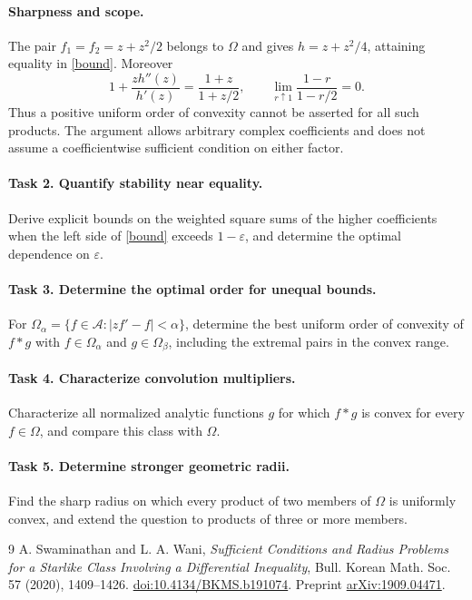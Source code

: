 \documentclass[11pt]{article}
\begin{document}
\paragraph{Sharpness and scope.}
The pair $f_1=f_2=z+z^2/2$ belongs to $\Omega$ and gives
$h=z+z^2/4$, attaining equality in \eqref{bound}. Moreover
\[
 1+\frac{zh''(z)}{h'(z)}=\frac{1+z}{1+z/2},
 \qquad \lim_{r\uparrow1}\frac{1-r}{1-r/2}=0.
\]
Thus a positive uniform order of convexity cannot be asserted for all such
products. The argument allows arbitrary complex coefficients and does not
assume a coefficientwise sufficient condition on either factor.

\paragraph{Task 2. Quantify stability near equality.}
Derive explicit bounds on the weighted square sums of the higher
coefficients when the left side of \eqref{bound} exceeds $1-\varepsilon$,
and determine the optimal dependence on $\varepsilon$.

\paragraph{Task 3. Determine the optimal order for unequal bounds.}
For $\Omega_\alpha=\{f\in\mathcal A:|zf'-f|<\alpha\}$, determine the best
uniform order of convexity of $f*g$ with $f\in\Omega_\alpha$ and
$g\in\Omega_\beta$, including the extremal pairs in the convex range.

\paragraph{Task 4. Characterize convolution multipliers.}
Characterize all normalized analytic functions $g$ for which
$f*g$ is convex for every $f\in\Omega$, and compare this class with $\Omega$.

\paragraph{Task 5. Determine stronger geometric radii.}
Find the sharp radius on which every product of two members of $\Omega$
is uniformly convex, and extend the question to products of three or more
members.

\begin{thebibliography}{9}
 A. Swaminathan and L. A. Wani,
\emph{Sufficient Conditions and Radius Problems for a Starlike Class
Involving a Differential Inequality}, Bull. Korean Math. Soc.
57 (2020), 1409--1426.
\href{https://doi.org/10.4134/BKMS.b191074}{doi:10.4134/BKMS.b191074}.
Preprint \href{https://arxiv.org/abs/1909.04471}{arXiv:1909.04471}.
\end{thebibliography}
\end{document}
